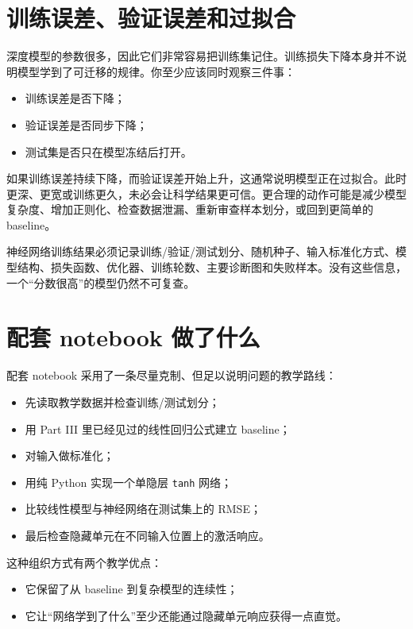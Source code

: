 \section{训练误差、验证误差和过拟合}

深度模型的参数很多，因此它们非常容易把训练集记住。训练损失下降本身并不说明模型学到了可迁移的规律。你至少应该同时观察三件事：

\begin{itemize}
    \item 训练误差是否下降；
    \item 验证误差是否同步下降；
    \item 测试集是否只在模型冻结后打开。
\end{itemize}

如果训练误差持续下降，而验证误差开始上升，这通常说明模型正在过拟合。此时更深、更宽或训练更久，未必会让科学结果更可信。更合理的动作可能是减少模型复杂度、增加正则化、检查数据泄漏、重新审查样本划分，或回到更简单的 baseline。

\begin{warnbox}[深度学习中的证据纪律]
神经网络训练结果必须记录训练/验证/测试划分、随机种子、输入标准化方式、模型结构、损失函数、优化器、训练轮数、主要诊断图和失败样本。没有这些信息，一个“分数很高”的模型仍然不可复查。
\end{warnbox}

\section{配套 notebook 做了什么}

配套 notebook 采用了一条尽量克制、但足以说明问题的教学路线：

\begin{itemize}
    \item 先读取教学数据并检查训练/测试划分；
    \item 用 Part III 里已经见过的线性回归公式建立 baseline；
    \item 对输入做标准化；
    \item 用纯 Python 实现一个单隐层 \texttt{tanh} 网络；
    \item 比较线性模型与神经网络在测试集上的 RMSE；
    \item 最后检查隐藏单元在不同输入位置上的激活响应。
\end{itemize}

这种组织方式有两个教学优点：

\begin{itemize}
    \item 它保留了从 baseline 到复杂模型的连续性；
    \item 它让“网络学到了什么”至少还能通过隐藏单元响应获得一点直觉。
\end{itemize}

